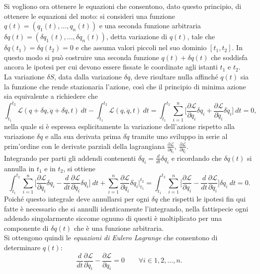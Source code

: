 Si vogliono ora ottenere le equazioni che consentono, dato questo principio, di ottenere le equazioni del moto: si consideri una funzione $q(t)=(q_1(t),...,q_n(t))$ e una seconda funzione arbitraria $\delta q(t)=(\delta q_1(t),...,\delta q_n(t))$, detta variazione di $q(t)$, tale che $\delta q (t_1)=\delta q(t_2)=0$ e che assuma valori piccoli nel suo dominio $[t_1,t_2]$. In questo modo si può costruire una seconda funzione $q(t)+\delta q(t)$ che soddisfa ancora le ipotesi per cui devono essere fissate le coordinate agli istanti $t_1$ e $ t_2$.\\
La variazione $\delta S$, data dalla variazione $\delta q$, deve risultare nulla affinché $q(t)$ sia la funzione che rende stazionaria l'azione, così che il principio di minima azione sia equivalente a richiedere che
\begin{equation}
    \int_{t_1}^{t_2} \mathcal{L}(q+\delta q,\dot{q}+\delta \dot{q},t)\ dt-\int_{t_1}^{t_2} \mathcal{L}(q,\dot{q},t)\ dt=\int_{t_1}^{t_2}\sum_{i=1}^{n}\bigg[\frac{\partial\mathcal{L} }{\partial q_i}\delta q_i+\frac{\partial\mathcal{L} }{\partial \dot{q}_i}\delta \dot{q}_i \bigg]\ dt=0,
\end{equation}
nella quale si è espressa esplicitamente la variazione dell'azione rispetto alla variazione $\delta q$ e alla sua derivata prima $\delta \dot{q}$ tramite uno sviluppo in serie al prim'ordine con le derivate parziali della lagrangiana $\frac{\partial\mathcal{L} }{\partial q_i},\ \frac{\partial\mathcal{L} }{\partial \dot{q}_i}$.\\
Integrando per parti gli addendi contenenti $\delta \dot{q}_i=\frac{d}{dt}\delta q_i$ e ricordando che $\delta q (t)$ si annulla in $t_1$ e in $t_2$, si ottiene
\begin{equation*}
    \int_{t_1}^{t_2}\sum_{i=1}^{n}\bigg[\frac{\partial\mathcal{L} }{\partial q_i}\delta q_i-\frac{d}{dt}\frac{\partial\mathcal{L} }{\partial \dot{q}_i}\delta q_i \bigg]\ dt+\sum_{i=1}^n\frac{\partial\mathcal{L} }{\partial \dot q_i}\delta \dot{q}_i\bigg|_{t_1}^{t_2}=\int_{t_1}^{t_2}\sum_{i=1}^{n}\bigg[\frac{\partial\mathcal{L} }{\partial q_i}-\frac{d}{dt}\frac{\partial\mathcal{L} }{\partial \dot{q}_i} \bigg]\delta q_i\ dt=0.
\end{equation*}
Poiché questo integrale deve annullarsi per ogni $\delta q$ che rispetti le ipotesi fin qui fatte è necessario che si annulli identicamente l'integrando, nella fattispecie ogni addendo singolarmente siccome ognuno di questi è moltiplicato per una componente di $\delta q(t)$ che è una funzione arbitraria.\\Si ottengono quindi le \emph{equazioni di Eulero Lagrange} che consentono di determinare $q(t)$:
\begin{equation}
    \label{eulero-lagrange}
    \frac{d}{dt}\frac{\partial\mathcal{L} }{\partial \dot{q}_i}-\frac{\partial\mathcal{L} }{\partial q_i}=0 \qquad \forall i\in{1,2,...,n}.
\end{equation}

